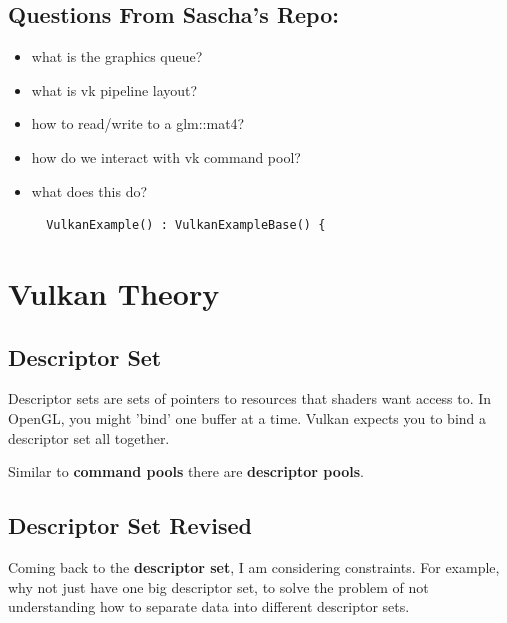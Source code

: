 \documentclass{article}
\begin{document}
\subsection*{Questions From Sascha's Repo:}
\begin{itemize}
  \item what is the graphics queue?
  \item what is vk pipeline layout?
  \item how to read/write to a glm::mat4?
  \item how do we interact with vk command pool?
  \item what does this do?
  \begin{verbatim}
  VulkanExample() : VulkanExampleBase() {
  \end{verbatim}

\end{itemize}

\section*{Vulkan Theory}
\subsection*{Descriptor Set}
\par Descriptor sets are sets of pointers to resources that shaders
want access to. In OpenGL, you might 'bind' one buffer at a time.
Vulkan expects you to bind a descriptor set all together.
\par Similar to \textbf{command pools} there are \textbf{descriptor pools}.

\subsection*{Descriptor Set Revised}
\par Coming back to the \textbf{descriptor set}, I am considering
constraints. For example, why not just have one big descriptor set,
to solve the problem of not understanding how to separate data into
different descriptor sets.
\end{document}

